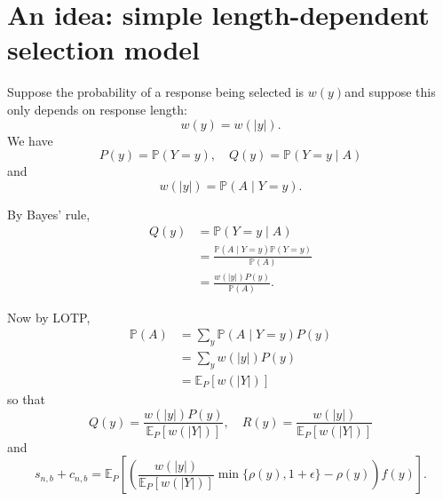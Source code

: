 \section*{An idea: simple length-dependent selection model}

Suppose the probability of a response being selected is $w(y)$and suppose this only depends on response length:
$$
w(y)=w(|y|) .
$$
We have 
$$
P(y)=\mathbb{P}(Y=y), \quad Q(y)=\mathbb{P}(Y=y \mid A)
$$
and
$$
w(|y|)=\mathbb{P}(A \mid Y=y) .
$$

By Bayes' rule,
\begin{align*}
Q(y) & =\mathbb{P}(Y=y \mid A) \\
& =\frac{\mathbb{P}(A \mid Y=y) \mathbb{P}(Y=y)}{\mathbb{P}(A)} \\
& =\frac{w(|y|) P(y)}{\mathbb{P}(A)} .
\end{align*}

Now by LOTP,
\begin{align*}
\mathbb{P}(A) & =\sum_y \mathbb{P}(A \mid Y=y) P(y) \\
& =\sum_y w(|y|) P(y) \\
& =\mathbb{E}_P[w(|Y|)] 
\end{align*}
so that 
$$Q(y)=\frac{w(|y|) P(y)}{\mathbb{E}_P[w(|Y|)]}, \quad R(y)=\frac{w(|y|)}{\mathbb{E}_P[w(|Y|)]}$$
and 
\begin{equation*}
s_{n, b}+c_{n, b}=\mathbb{E}_P[(\frac{w(|y|)}{\mathbb{E}_P[w(|Y|)]} \min \{\rho(y), 1+\epsilon\}-\rho(y)) f(y)].
\end{equation*}